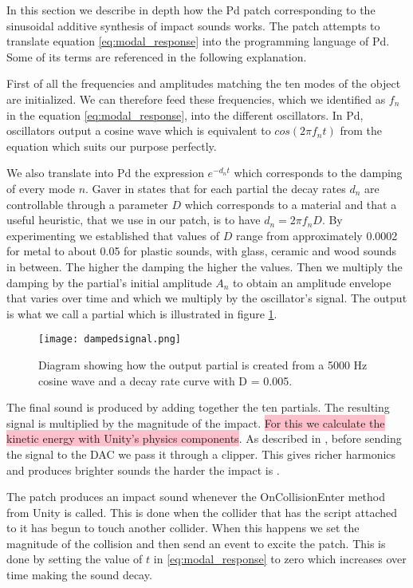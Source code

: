 In this section we describe in depth how the Pd patch corresponding to the sinusoidal additive synthesis of impact sounds works. The patch attempts to translate equation \ref{eq:modal_response} into the programming language of Pd. Some of its terms are referenced in the following explanation.

First of all the frequencies and amplitudes matching the ten modes of the object are initialized. We can therefore feed these frequencies, which we identified as $f_n$ in the equation \ref{eq:modal_response}, into the different oscillators. In Pd, oscillators output a cosine wave which is equivalent to $cos(2 \pi f_nt)$ from the equation which suits our purpose perfectly.

We also translate into Pd the expression $e^{-d_n t}$ which corresponds to the damping of every mode $n$. Gaver in \cite{gaver1993we} states that for each partial the decay rates $d_n$ are controllable through a parameter $D$ which corresponds to a material and that a useful heuristic, that we use in our patch, is to have $d_n = 2 \pi f_nD$. By experimenting we established that values of $D$ range from approximately 0.0002 for metal to about 0.05 for plastic sounds, with glass, ceramic and wood sounds in between. The higher the damping the higher the values. Then we multiply the damping by the partial's initial amplitude $A_n$ to obtain an amplitude envelope that varies over time and which we multiply by the oscillator's signal. The output is what we call a partial which is illustrated in figure \ref{fig:dampedsignal}. 

\begin{figure}[H]
  \centering
    \texttt{[image: dampedsignal.png]}
      \caption{Diagram showing how the output partial is created from a 5000 Hz cosine wave and a decay rate curve with D = 0.005.}
      \label{fig:dampedsignal}
\end{figure}

The final sound is produced by adding together the ten partials. The resulting signal is multiplied by the magnitude of the impact. \colorbox{pink}{For this we calculate the kinetic energy with Unity's physics components}. As described in \cite{farnell2010designing}, before sending the signal to the DAC we pass it through a clipper. This gives richer harmonics and produces brighter sounds the harder the impact is \cite{aramaki2009thinking}.

The patch produces an impact sound whenever the OnCollisionEnter method from Unity is called. This is done when the collider that has the script attached to it has begun to touch another collider. When this happens we set the magnitude of the collision and then send an event to excite the patch. This is done by setting the value of $t$ in \ref{eq:modal_response} to zero which increases over time making the sound decay.

